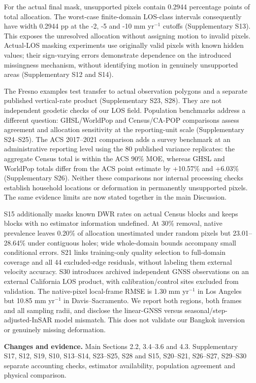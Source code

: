 \documentclass[11pt,a4paper]{article}
\begin{document}
For the actual final mask, unsupported pixels contain 0.2944 percentage points of total allocation. The worst-case finite-domain LOS-class intervals consequently have width 0.2944 pp at the -2, -5 and -10 mm yr$^{-1}$ cutoffs (Supplementary S13). This exposes the unresolved allocation without assigning motion to invalid pixels. Actual-LOS masking experiments use originally valid pixels with known hidden values; their sign-varying errors demonstrate dependence on the introduced missingness mechanism, without identifying motion in genuinely unsupported areas (Supplementary S12 and S14).

The Fresno examples test transfer to actual observation polygons and a separate published vertical-rate product (Supplementary S23, S28). They are not independent geodetic checks of our LOS field. Population benchmarks address a different question: GHSL/WorldPop and Census/CA-POP comparisons assess agreement and allocation sensitivity at the reporting-unit scale (Supplementary S24--S25). The ACS 2017--2021 comparison adds a survey benchmark at an administrative reporting level using the 80 published variance replicates: the aggregate Census total is within the ACS 90\% MOE, whereas GHSL and WorldPop totals differ from the ACS point estimate by +10.57\% and +6.03\% (Supplementary S26). Neither these comparisons nor internal processing checks establish household locations or deformation in permanently unsupported pixels. The same evidence limits are now stated together in the main Discussion.

S15 additionally masks known DWR rates on actual Census blocks and keeps blocks with no estimator information undefined. At 30\% removal, native prevalence leaves 0.20\% of allocation unestimated under random pixels but 23.01--28.64\% under contiguous holes; wide whole-domain bounds accompany small conditional errors. S21 links training-only quality selection to full-domain coverage and all 44 excluded-edge residuals, without labeling them external velocity accuracy. S30 introduces archived independent GNSS observations on an external California LOS product, with calibration/control sites excluded from validation. The native-pixel local-frame RMSE is 1.30 mm yr$^{-1}$ in Los Angeles but 10.85 mm yr$^{-1}$ in Davis--Sacramento. We report both regions, both frames and all sampling radii, and disclose the linear-GNSS versus seasonal/step-adjusted-InSAR model mismatch. This does not validate our Bangkok inversion or genuinely missing deformation.

\textbf{Changes and evidence.} Main Sections 2.2, 3.4--3.6 and 4.3. Supplementary S17, S12, S19, S10, S13--S14, S23--S25, S28 and S15, S20--S21, S26--S27, S29--S30 separate accounting checks, estimator availability, population agreement and physical comparison.
\end{document}
